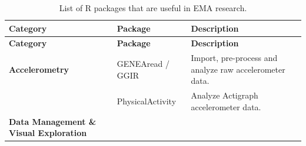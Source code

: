 \documentclass[]{book}
\begin{document}
\begin{longtable}[]{@{}lll@{}}
\caption{\label{tab:rcat} List of R packages that are useful in EMA
research.}\tabularnewline
\toprule
\begin{minipage}[b]{0.21\columnwidth}\raggedright\strut
\textbf{Category}\strut
\end{minipage} & \begin{minipage}[b]{0.23\columnwidth}\raggedright\strut
\textbf{Package}\strut
\end{minipage} & \begin{minipage}[b]{0.48\columnwidth}\raggedright\strut
\textbf{Description}\strut
\end{minipage}\tabularnewline
\midrule
\endfirsthead
\toprule
\begin{minipage}[b]{0.21\columnwidth}\raggedright\strut
\textbf{Category}\strut
\end{minipage} & \begin{minipage}[b]{0.23\columnwidth}\raggedright\strut
\textbf{Package}\strut
\end{minipage} & \begin{minipage}[b]{0.48\columnwidth}\raggedright\strut
\textbf{Description}\strut
\end{minipage}\tabularnewline
\midrule
\endhead
\begin{minipage}[t]{0.21\columnwidth}\raggedright\strut
\textbf{Accelerometry}\strut
\end{minipage} & \begin{minipage}[t]{0.23\columnwidth}\raggedright\strut
GENEAread / GGIR\strut
\end{minipage} & \begin{minipage}[t]{0.48\columnwidth}\raggedright\strut
Import, pre-process and analyze raw accelerometer data.\strut
\end{minipage}\tabularnewline
\begin{minipage}[t]{0.21\columnwidth}\raggedright\strut
\strut
\end{minipage} & \begin{minipage}[t]{0.23\columnwidth}\raggedright\strut
PhysicalActivity\strut
\end{minipage} & \begin{minipage}[t]{0.48\columnwidth}\raggedright\strut
Analyze Actigraph accelerometer data.\strut
\end{minipage}\tabularnewline
\begin{minipage}[t]{0.21\columnwidth}\raggedright\strut
\textbf{Data Management \& Visual Exploration}\strut
\end{minipage} & \begin{minipage}[t]{0.23\columnwidth}\raggedright\strut

\end{minipage}
\end{longtable}
\end{document}
